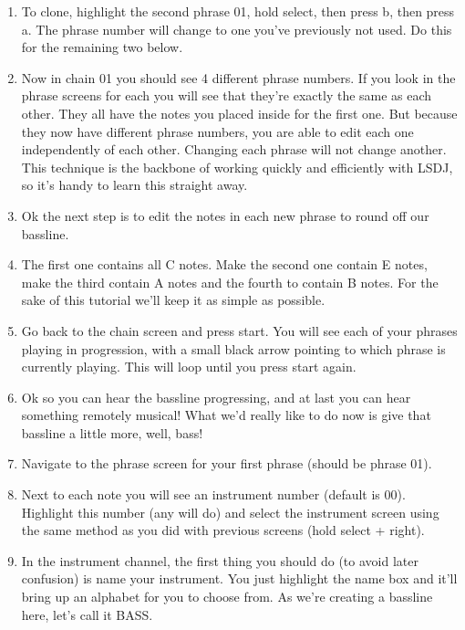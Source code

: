 \documentclass[]{article}
\begin{document}
\begin{enumerate}
\item To clone, highlight the second phrase 01, hold select, then press b, then press a. The phrase number will change to one you’ve previously not used. Do this for the remaining two below.

\item Now in chain 01 you should see 4 different phrase numbers. If you look in the phrase screens for each you will see that they’re exactly the same as each other. They all have the notes you placed inside for the first one. But because they now have different phrase numbers, you are able to edit each one independently of each other. Changing each phrase will not change another. This technique is the backbone of working quickly and efficiently with LSDJ, so it’s handy to learn this straight away.

\item Ok the next step is to edit the notes in each new phrase to round off our bassline.

\item The first one contains all C notes. Make the second one contain E notes, make the third contain A notes and the fourth to contain B notes. For the sake of this tutorial we’ll keep it as simple as possible.

\item Go back to the chain screen and press start. You will see each of your phrases playing in progression, with a small black arrow pointing to which phrase is currently playing. This will loop until you press start again.

\item Ok so you can hear the bassline progressing, and at last you can hear something remotely musical! What we’d really like to do now is give that bassline a little more, well, bass!

\item Navigate to the phrase screen for your first phrase (should be phrase 01).

\item Next to each note you will see an instrument number (default is 00). Highlight this number (any will do) and select the instrument screen using the same method as you did with previous screens (hold select + right).

\item In the instrument channel, the first thing you should do (to avoid later confusion) is name your instrument. You just highlight the name box and it’ll bring up an alphabet for you to choose from. As we’re creating a bassline here, let’s call it BASS.


\end{enumerate}
\end{document}
